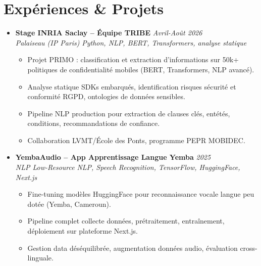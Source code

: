\documentclass[a4paper,11pt]{article}
\begin{document}
\section{Exp\'eriences \& Projets}
\begin{itemize}[leftmargin=*, label={-}]
    \item \textbf{Stage INRIA Saclay -- \'Equipe TRIBE} \hfill \textit{Avril-Ao\^ut 2026} \\
    \textit{Palaiseau (IP Paris)} \hfill \textit{Python, NLP, BERT, Transformers, analyse statique}
    \vspace{-2pt}
    \begin{itemize}[leftmargin=0.4cm, nosep, label=\tiny$\bullet$]
        \item \small{Projet PRIMO : classification et extraction d'informations sur 50k+ politiques de confidentialit\'e mobiles (BERT, Transformers, NLP avanc\'e).}
        \item \small{Analyse statique SDKs embarqu\'es, identification risques s\'ecurit\'e et conformit\'e RGPD, ontologies de donn\'ees sensibles.}
        \item \small{Pipeline NLP production pour extraction de clauses cl\'es, ent\'et\'es, conditions, recommandations de confiance.}
        \item \small{Collaboration LVMT/\'Ecole des Ponts, programme PEPR MOBIDEC.}
    \end{itemize}
    \vspace{3pt}

    \item \textbf{YembaAudio -- App Apprentissage Langue Yemba} \hfill \textit{2025} \\
    \textit{NLP Low-Resource} \hfill \textit{NLP, Speech Recognition, TensorFlow, HuggingFace, Next.js}
    \vspace{-2pt}
    \begin{itemize}[leftmargin=0.4cm, nosep, label=\tiny$\bullet$]
        \item \small{Fine-tuning mod\`eles HuggingFace pour reconnaissance vocale langue peu dot\'ee (Yemba, Cameroun).}
        \item \small{Pipeline complet collecte donn\'ees, pr\'etraitement, entra\^inement, d\'eploiement sur plateforme Next.js.}
        \item \small{Gestion data d\'es\'equilibr\'ee, augmentation donn\'ees audio, \'evaluation cross-linguale.}
    \end{itemize}
    \vspace{3pt}


\end{itemize}
\end{document}
